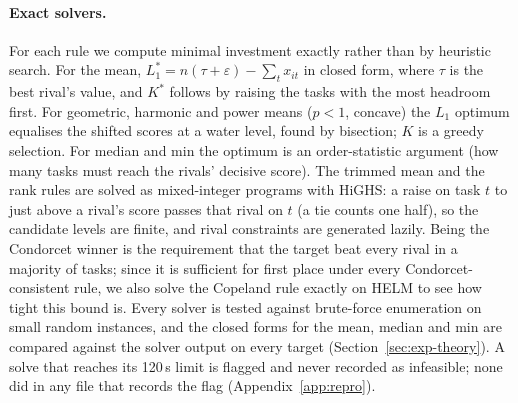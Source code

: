 \paragraph{Exact solvers.}
For each rule we compute minimal investment exactly rather than by heuristic search.
For the mean, $L_1^\ast=n(\tau+\varepsilon)-\sum_t x_{it}$ in closed form, where $\tau$ is the best rival's value, and $K^\ast$ follows by raising the tasks with the most headroom first.
For geometric, harmonic and power means ($p<1$, concave) the $L_1$ optimum equalises the shifted scores at a water level, found by bisection; $K$ is a greedy selection.
For median and min the optimum is an order-statistic argument (how many tasks must reach the rivals' decisive score).
The trimmed mean and the rank rules are solved as mixed-integer programs with HiGHS: a raise on task $t$ to just above a rival's score passes that rival on $t$ (a tie counts one half), so the candidate levels are finite, and rival constraints are generated lazily.
Being the Condorcet winner is the requirement that the target beat every rival in a majority of tasks; since it is sufficient for first place under every Condorcet-consistent rule, we also solve the Copeland rule exactly on HELM to see how tight this bound is.
Every solver is tested against brute-force enumeration on small random instances, and the closed forms for the mean, median and min are compared against the solver output on every target (Section~\ref{sec:exp-theory}).
A solve that reaches its 120\,s limit is flagged and never recorded as infeasible; none did in any file that records the flag (Appendix~\ref{app:repro}).
